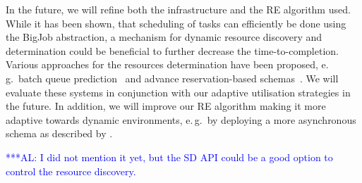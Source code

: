 \documentclass{rspublic}
\newcommand{\alnote}[1]{ {\textcolor{blue} { ***AL: #1 }}}
\newcommand{\alnote}[1]{}
\newcommand{\glidein}[1]{Glide-In }
\begin{document}
       

                                 


   

In the future, we will refine both the infrastructure and the RE algorithm
used. While it has been shown, that scheduling of tasks can efficiently be done using
the BigJob abstraction, a mechanism for dynamic resource discovery and determination 
could be beneficial to further decrease the time-to-completion. 
Various approaches for the resources determination have been proposed, e.\,g.\ batch queue 
prediction~\citep{1254939,Chakraborty:2008nx} and advance reservation-based 
schemas~\citep{Jeske:2007wj}. We will evaluate these systems in conjunction
with our adaptive utilisation strategies in the future. 
In addition, we will improve our RE algorithm making it
more adaptive towards dynamic environments, 
e.\,g.\ by deploying  a more asynchronous schema
as described by \citet{Gallicchio:2007yq}.


\alnote{I did not mention it yet, but the SD API could be a good option to control
the resource discovery.}

\end{document}
